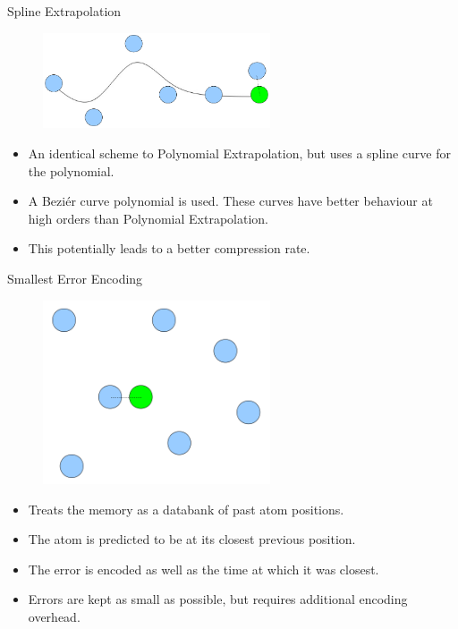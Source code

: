\documentclass{beamer}
\begin{document}
\begin{frame}{Spline Extrapolation}
  \begin{figure}[h]
    \centering \includegraphics[width=0.6\textwidth]{julian-images/p2.png}
  \end{figure}
\begin{itemize}
 \item An identical scheme to Polynomial Extrapolation, but uses a spline curve for the polynomial.
 \item A Bezi\'er curve polynomial is used. These curves have better behaviour at high orders than Polynomial Extrapolation.
 \item This potentially leads to a better compression rate.
\end{itemize}
\end{frame}

\begin{frame}{Smallest Error Encoding}
\begin{figure}[h]
    \centering \includegraphics[trim = 0mm 0mm 0mm 25mm, clip, width=0.6\textwidth]{julian-images/p3.png}
  \end{figure}
\begin{itemize}
 \item Treats the memory as a databank of past atom positions.
 \item The atom is predicted to be at its closest previous position.
 \item The error is encoded as well as the time at which it was closest.
 \item Errors are kept as small as possible, but requires additional encoding overhead.
\end{itemize}
\end{frame}
\end{document}
